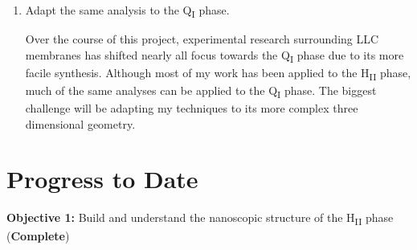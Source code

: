 \documentclass{article}
\begin{document}
\begin{enumerate}
    \item Adapt the same analysis to the Q\textsubscript{I} phase.
    
    Over the course of this project, experimental research surrounding
    LLC membranes has shifted nearly all focus towards the Q\textsubscript{I}
    phase due to its more facile synthesis.	Although most of my work has 
    been applied to the H\textsubscript{II} phase, much of the same analyses
    can be applied to the Q\textsubscript{I} phase. The biggest challenge will
    be adapting my techniques to its more complex three dimensional geometry.
    
%    
    
  \end{enumerate}

  \section{Progress to Date}\label{section:progress}
  
  \textbf{\large Objective 1:} {\large Build and understand the nanoscopic structure
  of the H\textsubscript{II} phase} (\textcolor{green!40!olive}{\textbf{Complete}})
  
\end{document}
